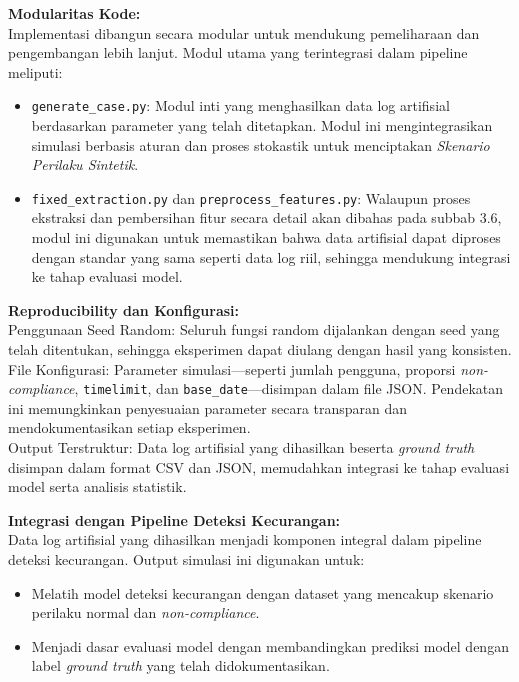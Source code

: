 \textbf{Modularitas Kode:} \\
Implementasi dibangun secara modular untuk mendukung pemeliharaan dan pengembangan lebih lanjut. Modul utama yang terintegrasi dalam pipeline meliputi:
\begin{itemize}
    \item \texttt{generate\_case.py}: Modul inti yang menghasilkan data log artifisial berdasarkan parameter yang telah ditetapkan. Modul ini mengintegrasikan simulasi berbasis aturan dan proses stokastik untuk menciptakan \textit{Skenario Perilaku Sintetik}.
    \item \texttt{fixed\_extraction.py} dan \texttt{preprocess\_features.py}: Walaupun proses ekstraksi dan pembersihan fitur secara detail akan dibahas pada subbab 3.6, modul ini digunakan untuk memastikan bahwa data artifisial dapat diproses dengan standar yang sama seperti data log riil, sehingga mendukung integrasi ke tahap evaluasi model.
\end{itemize}

\textbf{Reproducibility dan Konfigurasi:} \\
Penggunaan Seed Random: Seluruh fungsi random dijalankan dengan seed yang telah ditentukan, sehingga eksperimen dapat diulang dengan hasil yang konsisten. \\
File Konfigurasi: Parameter simulasi—seperti jumlah pengguna, proporsi \textit{non-compliance}, \texttt{timelimit}, dan \texttt{base\_date}—disimpan dalam file JSON. Pendekatan ini memungkinkan penyesuaian parameter secara transparan dan mendokumentasikan setiap eksperimen. \\
Output Terstruktur: Data log artifisial yang dihasilkan beserta \textit{ground truth} disimpan dalam format CSV dan JSON, memudahkan integrasi ke tahap evaluasi model serta analisis statistik.

\textbf{Integrasi dengan Pipeline Deteksi Kecurangan:} \\
Data log artifisial yang dihasilkan menjadi komponen integral dalam pipeline deteksi kecurangan. Output simulasi ini digunakan untuk:
\begin{itemize}
    \item Melatih model deteksi kecurangan dengan dataset yang mencakup skenario perilaku normal dan \textit{non-compliance}.
    \item Menjadi dasar evaluasi model dengan membandingkan prediksi model dengan label \textit{ground truth} yang telah didokumentasikan.
\end{itemize}

